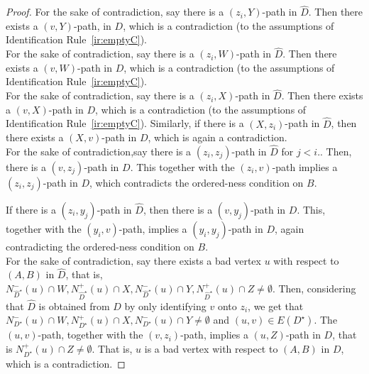 \begin{proof}
 For the sake of contradiction, say there is a $(z_i,Y)$-path in $\widehat{D}$. 
Then there exists a $(v,Y)$-path, in $D$, which is a contradiction (to the assumptions of Identification Rule~\ref{ir:emptyC}).\\

 For the sake of contradiction, say there is a $(z_i,W)$-path in $\widehat{D}$. 
Then there exists a $(v,W)$-path in $D$, which is a contradiction (to the assumptions of Identification Rule~\ref{ir:emptyC}).\\

 For the sake of contradiction, 
say there is a $(z_i,X)$-path in $\widehat{D}$. 
Then there exists a $(v,X)$-path in $D$, which is a contradiction (to the assumptions of Identification Rule~\ref{ir:emptyC}). Similarly,  if there is a $(X,z_i)$-path in $\widehat{D}$, then there exists a $(X,v)$-path in $D$, which is again a contradiction.\\

For the sake of contradiction,say there is a $(z_i,z_j)$-path in $\widehat{D}$ for $j <i$.. Then, there is a $(v,z_j)$-path in $D$. This together with the $(z_i,v)$-path implies a $(z_i,z_j)$-path in $D$, which contradicts the ordered-ness condition on $B$.

If there is a $(z_i,y_j)$-path in $\widehat{D}$,
then there is a $(v,y_j)$-path in $D$. This, together with the $(y_i,v)$-path, implies a $(y_i,y_j)$-path in $D$, again contradicting the ordered-ness condition on $B$.\\

 For the sake of contradiction, say there exists a bad vertex $u$ with respect to $(A,B)$ in $\widehat{D}$, that is, $N_{\widehat{D}^{\star}}^-(u) \cap W, N_{\widehat{D}^{\star}}^+(u) \cap X, N_{\widehat{D}^{\star}}^-(u) \cap Y, N_{\widehat{D}^{\star}}^+(u) \cap Z \neq \emptyset$. 
Then, considering that $\widehat{D}$ is obtained from $D$ by only identifying $v$ onto $z_i$, we get that
$N_{D^{\star}}^-(u) \cap W, N_{D^{\star}}^+(u) \cap X, N_{D^{\star}}^-(u) \cap Y \neq \emptyset$ and $(u,v) \in E(D^{\star})$.  The $(u,v)$-path, together with the $(v,z_i)$-path, implies a $(u,Z)$-path in $D$, that is $N_{D^{\star}}^+(u) \cap Z \neq \emptyset$. That is, $u$ is a bad vertex with respect to $(A,B)$ in $D$, which is a contradiction.
\end{proof}

